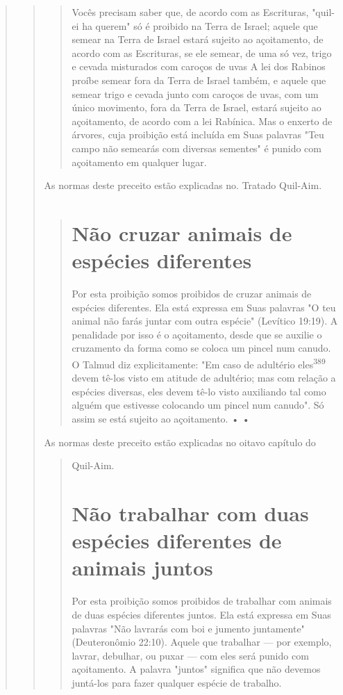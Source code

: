 \begin{quote}
\begin{quote}
\begin{quote}
Vocês precisam saber que, de acordo com as Escrituras, "quil-ei ha
querem" só é proibido na Terra de Israel; aquele que semear na Terra de
Israel estará sujeito ao açoitamento, de acordo com as Escrituras, se
ele semear, de uma só vez, trigo e cevada misturados com caroços de uvas
A lei dos Rabinos proíbe semear fora da Terra de Israel também, e aquele
que semear trigo e ce­vada junto com caroços de uvas, com um único
movimento, fora da Terra de Israel, estará sujeito ao açoitamento, de
acordo com a lei Rabínica. Mas o en­xerto de árvores, cuja proibição
está incluída em Suas palavras "Teu campo não semearás com diversas
sementes" é punido com açoitamento em qualquer lugar.
\end{quote}

As normas deste preceito estão explicadas no. Tratado Quil-Aim.

\begin{quote}
\section{Não cruzar animais de espécies diferentes}

Por esta proibição somos proibidos de cruzar animais de espécies
diferentes. Ela está expressa em Suas palavras "O teu animal não farás
juntar com outra espécie" (Levítico 19:19). A penalidade por isso é o
açoitamento, desde que se auxilie o cruzamento da forma como se coloca
um pincel num canudo. O Talmud diz explicitamente: "Em caso de adultério
eles\textsuperscript{389} devem tê-los visto em atitude de adultério;
mas com relação a espécies diversas, eles devem tê-lo visto auxiliando
tal como alguém que estivesse colocando um pin­cel num canudo". Só assim
se está sujeito ao açoitamento. • •
\end{quote}

As normas deste preceito estão explicadas no oitavo capítulo do

\begin{quote}
Quil-Aim.

\section{Não trabalhar com duas espécies diferentes de animais juntos}

Por esta proibição somos proibidos de trabalhar com animais de duas
espécies diferentes juntos. Ela está expressa em Suas palavras "Não
lavrarás com boi e jumento juntamente" (Deuteronômio 22:10). 
Aquele que trabalhar ---
por exemplo, lavrar, debulhar, ou puxar --- com eles será punido com
açoitamen­to. A palavra "juntos" significa que não devemos juntá-los
para fazer qualquer espécie de trabalho.


\end{quote}
\end{quote}
\end{quote}
